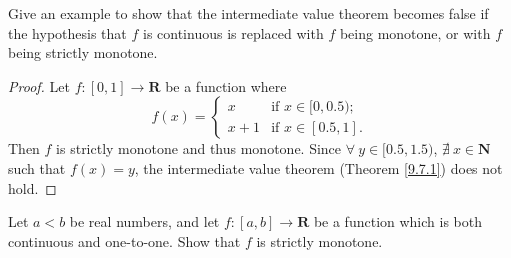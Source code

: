 \begin{exercise}\label{ex 9.8.2}
    Give an example to show that the intermediate value theorem becomes false if the hypothesis that \(f\) is continuous is replaced with \(f\) being monotone, or with \(f\) being strictly monotone.
\end{exercise}

\begin{proof}
    Let \(f : [0, 1] \to \mathbf{R}\) be a function where
    \[
        f(x) = \begin{cases}
            x & \text{if } x \in [0, 0.5); \\
            x + 1 & \text{if } x \in [0.5, 1].
        \end{cases}
    \]
    Then \(f\) is strictly monotone and thus monotone.
    Since \(\forall\ y \in [0.5, 1.5)\), \(\nexists\ x \in \mathbf{N}\) such that \(f(x) = y\), the intermediate value theorem (Theorem \ref{9.7.1}) does not hold.
\end{proof}

\begin{exercise}\label{ex 9.8.3}
    Let \(a < b\) be real numbers, and let \(f : [a, b] \to \mathbf{R}\) be a function which is both continuous and one-to-one.
    Show that \(f\) is strictly monotone.
\end{exercise}


